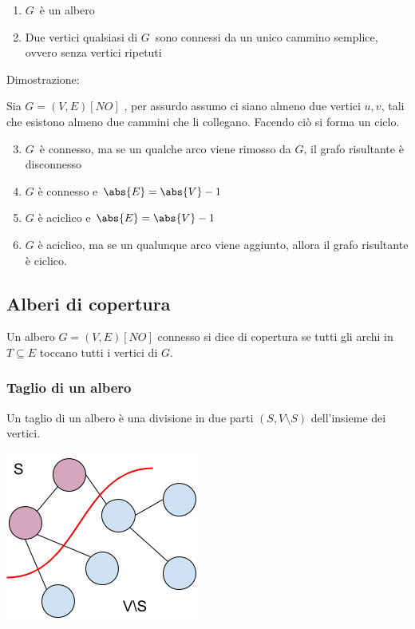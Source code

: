 \documentclass{article}
\providecommand{\tightlist}{%
  \setlength{\itemsep}{0pt}\setlength{\parskip}{0pt}}
\begin{document}
{{\begin{enumerate}
\tightlist
\item
  $G${~è un albero}
\item
  {Due vertici qualsiasi di }$G${~sono
  connessi da un unico cammino semplice, ovvero senza vertici ripetuti}
\end{enumerate}

{Dimostrazione}{:~~~~~~~~}

{Sia }$G=(V,E) [NO]$ {, per assurdo assumo ci siano almeno due vertici $u,v$, tali che esistono almeno due cammini che li collegano. Facendo ciò si forma un ciclo.}

\begin{enumerate}
\setcounter{enumi}{2}
\tightlist
\item
  $G${~è connesso, ma se un qualche
  arco viene rimosso da }$G${, il
  grafo risultante è disconnesso}
\item
  {$G$ è connesso e $\abs{E}=\abs{V}-1$}
\item
  {$G$ è aciclico e $\abs{E}=\abs{V}-1$}
\item
  {$G$ è aciclico, ma se un qualunque arco viene aggiunto, allora il grafo risultante è ciclico.}
\end{enumerate}

{}

\hypertarget{h.9btor4ygb1hb}{\subsection{\texorpdfstring{{Alberi di
copertura}}{Alberi di copertura}}\label{h.9btor4ygb1hb}}

{Un albero $G=(V,E) [NO]$ connesso si dice di copertura se tutti gli archi in $T \subseteq E$ toccano tutti i vertici di $G$.}

\hypertarget{h.rdrr6bsx8ypo}{\subsubsection{\texorpdfstring{{Taglio di
un albero}}{Taglio di un albero}}\label{h.rdrr6bsx8ypo}}

{Un taglio di un albero è una divisione in due parti $(S,V\setminus S)$ dell'insieme dei vertici.}


{\includegraphics{images/image527.png}}


}}
\end{document}
